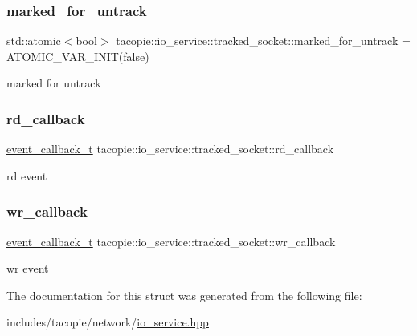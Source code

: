 \subsubsection{\texorpdfstring{marked\+\_\+for\+\_\+untrack}{marked\_for\_untrack}}
{\footnotesize\ttfamily std\+::atomic$<$bool$>$ tacopie\+::io\+\_\+service\+::tracked\+\_\+socket\+::marked\+\_\+for\+\_\+untrack = A\+T\+O\+M\+I\+C\+\_\+\+V\+A\+R\+\_\+\+I\+N\+IT(false)}



marked for untrack 

\mbox{\label{structtacopie_1_1io__service_1_1tracked__socket_a4e44d4d8132f5272de80e83156d44fc6}} 
\subsubsection{\texorpdfstring{rd\+\_\+callback}{rd\_callback}}
{\footnotesize\ttfamily \hyperlink{classtacopie_1_1io__service_abb66850c32d9c724f4418d77bd04bcfd}{event\+\_\+callback\+\_\+t} tacopie\+::io\+\_\+service\+::tracked\+\_\+socket\+::rd\+\_\+callback}



rd event 

\mbox{\label{structtacopie_1_1io__service_1_1tracked__socket_ae46fc6ee7102027316eceff64116ba9d}} 
\subsubsection{\texorpdfstring{wr\+\_\+callback}{wr\_callback}}
{\footnotesize\ttfamily \hyperlink{classtacopie_1_1io__service_abb66850c32d9c724f4418d77bd04bcfd}{event\+\_\+callback\+\_\+t} tacopie\+::io\+\_\+service\+::tracked\+\_\+socket\+::wr\+\_\+callback}



wr event 



The documentation for this struct was generated from the following file\+:\begin{DoxyCompactItemize}
\item 
includes/tacopie/network/\hyperlink{io__service_8hpp}{io\+\_\+service.\+hpp}\end{DoxyCompactItemize}
